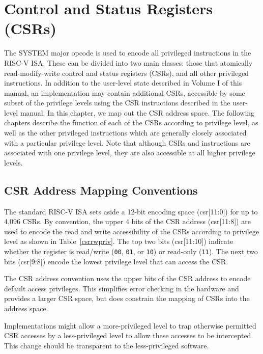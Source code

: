 \chapter{Control and Status Registers (CSRs)}
\label{chap:priv-csrs}

The SYSTEM major opcode is used to encode all privileged instructions
in the RISC-V ISA.  These can be divided into two main classes: those
that atomically read-modify-write control and status registers (CSRs),
and all other privileged instructions.  In addition to the user-level
state described in Volume I of this manual, an implementation may
contain additional CSRs, accessible by some subset of the privilege
levels using the CSR instructions described in the user-level manual.
In this chapter, we map out the CSR address space.  The following
chapters describe the function of each of the CSRs according to
privilege level, as well as the other privileged instructions which
are generally closely associated with a particular privilege level.
Note that although CSRs and instructions are associated with one
privilege level, they are also accessible at all higher privilege
levels.

\section{CSR Address Mapping Conventions}

The standard RISC-V ISA sets aside a 12-bit encoding space (csr[11:0])
for up to 4,096 CSRs.  By convention, the upper 4 bits of the CSR
address (csr[11:8]) are used to encode the read and write
accessibility of the CSRs according to privilege level as shown in
Table~\ref{csrrwpriv}.  The top two bits (csr[11:10]) indicate whether
the register is read/write ({\tt 00}, {\tt 01}, or {\tt 10}) or
read-only ({\tt 11}).  The next two bits (csr[9:8]) encode the lowest
privilege level that can access the CSR.

\begin{commentary}
The CSR address convention uses the upper bits of the CSR address to
encode default access privileges.  This simplifies error checking in
the hardware and provides a larger CSR space, but does constrain the
mapping of CSRs into the address space.

Implementations might allow a more-privileged level to trap otherwise
permitted CSR accesses by a less-privileged level to allow these
accesses to be intercepted.  This change should be transparent to the
less-privileged software.
\end{commentary}

